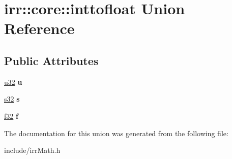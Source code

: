 \hypertarget{unionirr_1_1core_1_1inttofloat}{}\section{irr\+:\+:core\+:\+:inttofloat Union Reference}
\label{unionirr_1_1core_1_1inttofloat}
\subsection*{Public Attributes}
\begin{DoxyCompactItemize}
\item 
\hyperlink{namespaceirr_a0416a53257075833e7002efd0a18e804}{u32} {\bfseries u}\hypertarget{unionirr_1_1core_1_1inttofloat_a87651356c7436ac7755e85189412f75a}{}\label{unionirr_1_1core_1_1inttofloat_a87651356c7436ac7755e85189412f75a}

\item 
\hyperlink{namespaceirr_ac66849b7a6ed16e30ebede579f9b47c6}{s32} {\bfseries s}\hypertarget{unionirr_1_1core_1_1inttofloat_a1adc8b3417ac325bd9695c0cbb6c043e}{}\label{unionirr_1_1core_1_1inttofloat_a1adc8b3417ac325bd9695c0cbb6c043e}

\item 
\hyperlink{namespaceirr_a0277be98d67dc26ff93b1a6a1d086b07}{f32} {\bfseries f}\hypertarget{unionirr_1_1core_1_1inttofloat_ab0dd36fa35cbb368602fa0d18b2d9788}{}\label{unionirr_1_1core_1_1inttofloat_ab0dd36fa35cbb368602fa0d18b2d9788}

\end{DoxyCompactItemize}


The documentation for this union was generated from the following file\+:\begin{DoxyCompactItemize}
\item 
include/irr\+Math.\+h\end{DoxyCompactItemize}
